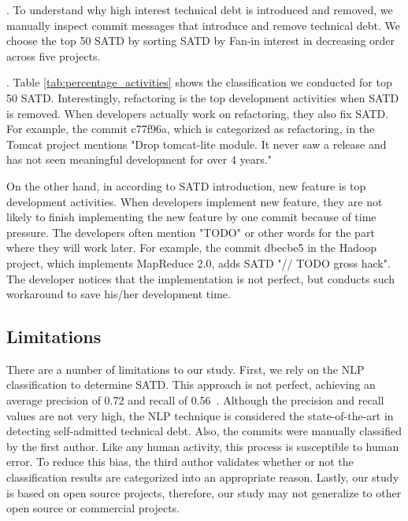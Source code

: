 \documentclass[10pt, conference]{IEEEtran}
\newcommand{\smallsection}[1]{\vspace{1mm}\noindent {\bf #1}.\hspace{2mm}}
\begin{document}
\smallsection{Approach}
To understand why high interest technical debt is introduced and removed, we manually inspect commit messages that introduce and remove technical debt. We choose the top 50 SATD by sorting SATD by Fan-in interest in decreasing order across five projects.


\smallsection{Results}
Table \ref{tab:percentage_activities} shows the classification we conducted for top 50 SATD. Interestingly, refactoring is the top development activities when SATD is removed. When developers actually work on refactoring, they also fix SATD. For example, the commit c77f96a, which is categorized as refactoring, in the Tomcat project mentions "Drop tomcat-lite module. It never saw a release and has not seen meaningful development for over 4 years."

On the other hand, in according to SATD introduction, new feature is top development activities. When developers implement new feature, they are not likely to finish implementing the new feature by one commit because of time pressure. The developers often mention "TODO" or other words for the part where they will work later. For example, the commit dbecbe5 in the Hadoop project, which implements MapReduce 2.0, adds SATD "// TODO gross hack". The developer notices that the implementation is not perfect, but conducts such workaround to save his/her development time.

\subsection{Limitations} \label{limitations}
There are a number of limitations to our study. First, we rely on the NLP classification to determine SATD. This approach is not perfect, achieving an average precision of 0.72 and recall of 0.56~\cite{Maldonado_TSE2017}. Although the precision and recall values are not very high, the NLP technique is considered the state-of-the-art in detecting self-admitted technical debt. Also, the commits were manually classified by the first author. Like any human activity, this process is susceptible to human error. To reduce this bias, the third author validates whether or not the classification results are categorized into an appropriate reason. Lastly, our study is based on open source projects, therefore, our study may not generalize to other open source or commercial projects.
\end{document}
